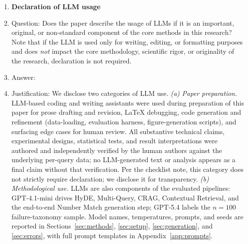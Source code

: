\begin{enumerate}
\item {\bf Declaration of LLM usage}
    \item[] Question: Does the paper describe the usage of LLMs if it is an important, original, or non-standard component of the core methods in this research? Note that if the LLM is used only for writing, editing, or formatting purposes and does \emph{not} impact the core methodology, scientific rigor, or originality of the research, declaration is not required.
    \item[] Answer: \answerYes{}
    \item[] Justification: We disclose two categories of LLM use. \emph{(a) Paper preparation.} LLM-based coding and writing assistants were used during preparation of this paper for prose drafting and revision, \LaTeX{} debugging, code generation and refinement (data-loading, evaluation harness, figure-generation scripts), and surfacing edge cases for human review. All substantive technical claims, experimental designs, statistical tests, and result interpretations were authored and independently verified by the human authors against the underlying per-query data; no LLM-generated text or analysis appears as a final claim without that verification. Per the checklist note, this category does not strictly require declaration; we disclose it for transparency. \emph{(b) Methodological use.} LLMs are also components of the evaluated pipelines: GPT-4.1-mini drives HyDE, Multi-Query, CRAG, Contextual Retrieval, and the end-to-end Number Match generation step; GPT-5.4 labels the $n{=}100$ failure-taxonomy sample. Model names, temperatures, prompts, and seeds are reported in Sections~\ref{sec:methods}, \ref{sec:setup}, \ref{sec:generation}, and \ref{sec:errors}, with full prompt templates in Appendix~\ref{app:prompts}.

\end{enumerate}
